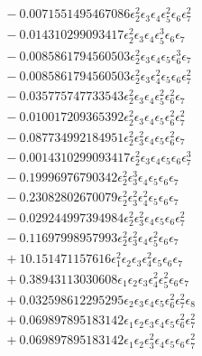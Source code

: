 \documentclass[10pt]{article}
\begin{document}
\begin{align*}
&{}  - 0.0071551495467086 \epsilon_{2}^{2} \epsilon_{3} \epsilon_{4} \epsilon_{5}^{2} \epsilon_{6} \epsilon_{7}^{2} \\
&{}  - 0.014310299093417 \epsilon_{2}^{2} \epsilon_{3} \epsilon_{4} \epsilon_{5}^{3} \epsilon_{6} \epsilon_{7} \\
&{}  - 0.0085861794560503 \epsilon_{2}^{2} \epsilon_{3} \epsilon_{4} \epsilon_{5} \epsilon_{6}^{3} \epsilon_{7} \\
&{}  - 0.0085861794560503 \epsilon_{2}^{2} \epsilon_{3} \epsilon_{4}^{2} \epsilon_{5} \epsilon_{6} \epsilon_{7}^{2} \\
&{}  - 0.035775747733543 \epsilon_{2}^{2} \epsilon_{3} \epsilon_{4} \epsilon_{5}^{2} \epsilon_{6}^{2} \epsilon_{7} \\
&{}  - 0.010017209365392 \epsilon_{2}^{2} \epsilon_{3} \epsilon_{4} \epsilon_{5} \epsilon_{6}^{2} \epsilon_{7}^{2} \\
&{}  - 0.087734992184951 \epsilon_{2}^{2} \epsilon_{3}^{2} \epsilon_{4} \epsilon_{5} \epsilon_{6}^{2} \epsilon_{7} \\
&{}  - 0.0014310299093417 \epsilon_{2}^{2} \epsilon_{3} \epsilon_{4} \epsilon_{5} \epsilon_{6} \epsilon_{7}^{3} \\
&{}  - 0.19996976790342 \epsilon_{2}^{2} \epsilon_{3}^{3} \epsilon_{4} \epsilon_{5} \epsilon_{6} \epsilon_{7} \\
&{}  - 0.23082802670079 \epsilon_{2}^{2} \epsilon_{3}^{2} \epsilon_{4}^{2} \epsilon_{5} \epsilon_{6} \epsilon_{7} \\
&{}  - 0.029244997394984 \epsilon_{2}^{2} \epsilon_{3}^{2} \epsilon_{4} \epsilon_{5} \epsilon_{6} \epsilon_{7}^{2} \\
&{}  - 0.11697998957993 \epsilon_{2}^{2} \epsilon_{3}^{2} \epsilon_{4} \epsilon_{5}^{2} \epsilon_{6} \epsilon_{7} \\
&{}  + 10.151471157616 \epsilon_{1}^{2} \epsilon_{2} \epsilon_{3} \epsilon_{4}^{2} \epsilon_{5} \epsilon_{6} \epsilon_{7} \\
&{}  + 0.38943113030608 \epsilon_{1} \epsilon_{2} \epsilon_{3} \epsilon_{4}^{2} \epsilon_{5}^{2} \epsilon_{6} \epsilon_{7} \\
&{}  + 0.032598612295295 \epsilon_{2} \epsilon_{3} \epsilon_{4} \epsilon_{5} \epsilon_{6}^{2} \epsilon_{7}^{2} \epsilon_{8} \\
&{}  + 0.069897895183142 \epsilon_{1} \epsilon_{2} \epsilon_{3} \epsilon_{4} \epsilon_{5} \epsilon_{6}^{2} \epsilon_{7}^{2} \\
&{}  + 0.069897895183142 \epsilon_{1} \epsilon_{2} \epsilon_{3}^{2} \epsilon_{4} \epsilon_{5} \epsilon_{6} \epsilon_{7}^{2} \\

\end{align*}
\end{document}
